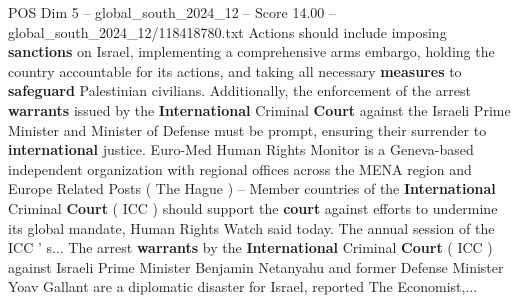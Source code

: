 \begin{textsample}{POS Dim 5 – global\_south\_2024\_12 – Score 14.00 – global\_south\_2024\_12/118418780.txt}
Actions should include imposing \textbf{sanctions} on Israel, implementing a comprehensive arms embargo, holding the country accountable for its actions, and taking all necessary \textbf{measures} to \textbf{safeguard} Palestinian civilians.
Additionally, the enforcement of the arrest \textbf{warrants} issued by the \textbf{International} Criminal \textbf{Court} against the Israeli Prime Minister and Minister of Defense must be prompt, ensuring their surrender to \textbf{international} justice.
Euro-Med Human Rights Monitor is a Geneva-based independent organization with regional offices across the MENA region and Europe Related Posts ( The Hague ) -- Member countries of the \textbf{International} Criminal \textbf{Court} ( ICC ) should support the \textbf{court} against efforts to undermine its global mandate, Human Rights Watch said today.
The annual session of the ICC ' s...
The arrest \textbf{warrants} by the \textbf{International} Criminal \textbf{Court} ( ICC ) against Israeli Prime Minister Benjamin Netanyahu and former Defense Minister Yoav Gallant are a diplomatic disaster for Israel, reported The Economist,...

\end{textsample}
